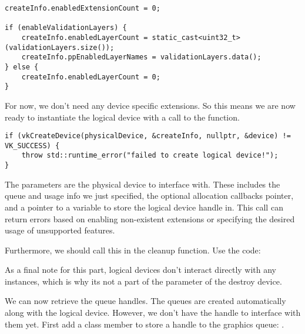 \begin{center}
\begin{minipage}{0.95\linewidth}
\begin{lstlisting}
createInfo.enabledExtensionCount = 0;

if (enableValidationLayers) {
    createInfo.enabledLayerCount = static_cast<uint32_t>(validationLayers.size());
    createInfo.ppEnabledLayerNames = validationLayers.data();
} else {
    createInfo.enabledLayerCount = 0;
}
\end{lstlisting}
\end{minipage}
\end{center}

\par For now, we don't need any device specific extensions. So this means we are now ready to instantiate the logical device with a call to the  function.

\begin{center}
\begin{minipage}{0.95\linewidth}
\begin{lstlisting}
if (vkCreateDevice(physicalDevice, &createInfo, nullptr, &device) != VK_SUCCESS) {
    throw std::runtime_error("failed to create logical device!");
}
\end{lstlisting}
\end{minipage}
\end{center}

\par The parameters are the physical device to interface with. These includes the queue and usage info we just specified, the optional allocation callbacks pointer, and a pointer to a variable to store the logical device handle in. This call can return errors based on enabling non-existent extensions or specifying the desired usage of unsupported features.

\par Furthermore, we should call this in the cleanup function. Use the code: 

\par As a final note for this part, logical devices don't interact directly with any instances, which is why its not a part of the parameter of the destroy device.

\par We can now retrieve the queue handles. The queues are created automatically along with the logical device. However, we don't have the handle to interface with them yet. First add a class member to store a handle to the graphics queue: . 

